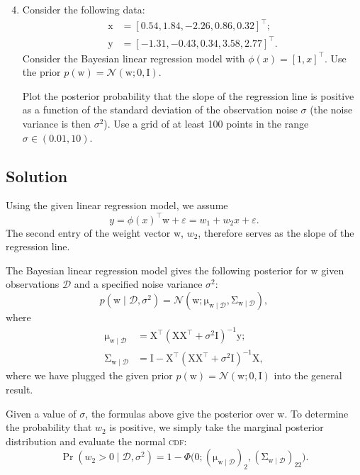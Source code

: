 \documentclass{article}
\newcommand{\acro}[1]{\textsc{\MakeLowercase{#1}}}
\newcommand{\given}{\mid}
\newcommand{\mc}[1]{\mathcal{#1}}
\newcommand{\data}{\mc{D}}
\newcommand{\trans}{^\top}
\newcommand{\inv}{^{-1}}
\newcommand{\mat}[1]{\bm{\mathrm{#1}}}
\renewcommand{\vec}[1]{\bm{\mathrm{#1}}}
\begin{document}
\clearpage
\begin{enumerate}
\setcounter{enumi}{3}
\item
  Consider the following data:
  \begin{align*}
    \vec{x} &= [0.54, 1.84, -2.26, 0.86, 0.32]\trans; \\
    \vec{y} &= [-1.31, -0.43, 0.34, 3.58, 2.77]\trans.
  \end{align*}
  Consider the Bayesian linear regression model with $\phi(x) = [1,
    x]\trans$.  Use the prior $p(\vec{w}) = \mc{N}(\vec{w}; \vec{0},
  \mat{I})$.

  Plot the posterior probability that the slope of the regression line
  is positive as a function of the standard deviation of the
  observation noise $\sigma$ (the noise variance is then $\sigma^2$).
  Use a grid of at least 100 points in the range $\sigma \in (0.01,
  10)$.
\end{enumerate}

\subsection*{Solution}

Using the given linear regression model, we assume
\begin{equation*}
  y
  =
  \phi(x)\trans \vec{w} + \varepsilon
  =
  w_1 + w_2 x + \varepsilon.
\end{equation*}
The second entry of the weight vector $\vec{w}$, $w_2$, therefore
serves as the slope of the regression line.

The Bayesian linear regression model gives the following posterior for
$\vec{w}$ given observations $\data$ and a specified noise variance
$\sigma^2$:
\begin{equation*}
  p(\vec{w} \given \data, \sigma^2)
  =
  \mc{N}(\vec{w};
  \vec{\mu}_{\vec{w}\given\data},
  \mat{\Sigma}_{\vec{w}\given\data}
  ),
\end{equation*}
where
\begin{align*}
  \vec{\mu}_{\vec{w}\given\data}
  &=
  \mat{X}\trans
  (\mat{X}\mat{X}\trans + \sigma^2 \mat{I})\inv
  \vec{y};
  \\
  \mat{\Sigma}_{\vec{w}\given\data}
  &=
  \mat{I}
  -
  \mat{X}\trans
  (\mat{X}\mat{X}\trans + \sigma^2 \mat{I})\inv
  \mat{X},
\end{align*}
where we have plugged the given prior $p(\vec{w}) = \mc{N}(\vec{w};
\vec{0}, \mat{I})$ into the general result.

Given a value of $\sigma$, the formulas above give the posterior over
$\vec{w}$.  To determine the probability that $w_2$ is positive, we
simply take the marginal posterior distribution and evaluate the
normal \acro{CDF}:
\begin{equation*}
  \Pr(w_2 > 0 \given \data, \sigma^2)
  =
  1 -
  \Phi\bigl(
  0;
  (\vec{\mu}_{\vec{w}\given\data})_2
  ,
  (\mat{\Sigma}_{\vec{w}\given\data})_{22}
  \bigr).
\end{equation*}
\end{document}
